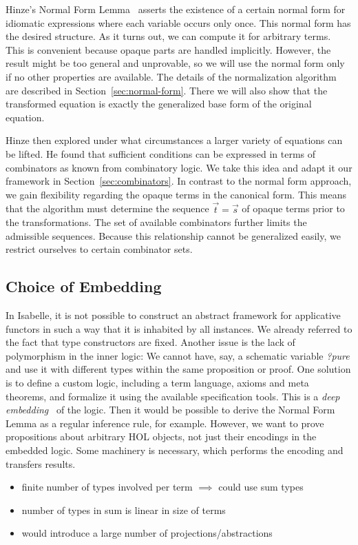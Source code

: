 Hinze's Normal Form Lemma~\cite[7]{hinze10} asserts the existence of a certain
normal form for idiomatic expressions where each variable occurs only once.
This normal form has the desired structure.
As it turns out, we can compute it for arbitrary terms.
This is convenient because opaque parts are handled implicitly.
However, the result might be too general and unprovable, so we will use the
normal form only if no other properties are available.
The details of the normalization algorithm are described in
Section~\ref{sec:normal-form}.
There we will also show that the transformed equation is exactly the generalized
base form of the original equation.

Hinze then explored under what circumstances a larger variety of equations can
be lifted.
He found that sufficient conditions can be expressed in terms of combinators
as known from combinatory logic.
We take this idea and adapt it our framework in Section~\ref{sec:combinators}.
In contrast to the normal form approach, we gain flexibility regarding the
opaque terms in the canonical form.
This means that the algorithm must determine the sequence $\vec t = \vec s$
of opaque terms prior to the transformations.
The set of available combinators further limits the admissible sequences.
Because this relationship cannot be generalized easily, we restrict ourselves
to certain combinator sets.

\subsection{Choice of Embedding}\label{subsec:embedding}

In Isabelle, it is not possible to construct an abstract framework for
applicative functors in such a way that it is inhabited by all instances.
We already referred to the fact that type constructors are fixed.
Another issue is the lack of polymorphism in the inner logic:
We cannot have, say, a schematic variable \textit{?pure} and use it with
different types within the same proposition or proof.
One solution is to define a custom logic, including a term language, axioms
and meta theorems, and formalize it using the available specification tools.
This is a \emph{deep embedding}~\cite{wildmoser04} of the logic.
Then it would be possible to derive the Normal Form Lemma as a regular
inference rule, for example.
However, we want to prove propositions about arbitrary HOL objects, not just
their encodings in the embedded logic.
Some machinery is necessary, which performs the encoding and transfers results.
\begin{itemize}
\item finite number of types involved per term $\implies$ could use sum types
\item number of types in sum is linear in size of terms
\item would introduce a large number of projections/abstractions
\end{itemize}
\todo

